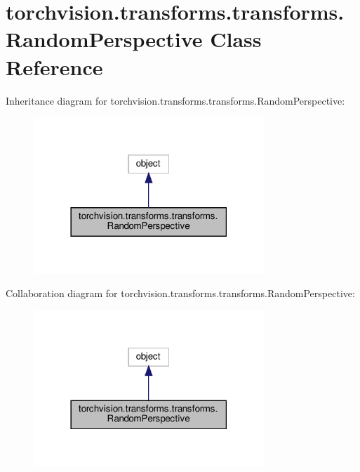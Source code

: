 \hypertarget{classtorchvision_1_1transforms_1_1transforms_1_1RandomPerspective}{}\section{torchvision.\+transforms.\+transforms.\+Random\+Perspective Class Reference}
\label{classtorchvision_1_1transforms_1_1transforms_1_1RandomPerspective}


Inheritance diagram for torchvision.\+transforms.\+transforms.\+Random\+Perspective\+:
\nopagebreak
\begin{figure}[H]
\begin{center}
\leavevmode
\includegraphics[width=246pt]{classtorchvision_1_1transforms_1_1transforms_1_1RandomPerspective__inherit__graph}
\end{center}
\end{figure}


Collaboration diagram for torchvision.\+transforms.\+transforms.\+Random\+Perspective\+:
\nopagebreak
\begin{figure}[H]
\begin{center}
\leavevmode
\includegraphics[width=246pt]{classtorchvision_1_1transforms_1_1transforms_1_1RandomPerspective__coll__graph}
\end{center}
\end{figure}
